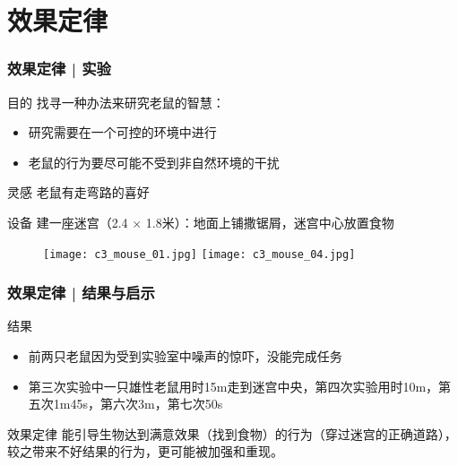 \section{效果定律}
\begin{frame}
  \frametitle{效果定律 | 实验}
    \vspace{-0.5em}
  \begin{block}{目的}
    找寻一种办法来研究老鼠的智慧：
    \begin{itemize}
      \item 研究需要在一个可控的环境中进行
      \item 老鼠的行为要尽可能不受到非自然环境的干扰
    \end{itemize}
  \end{block}
    \vspace{-0.5em}
  \pause
  \begin{block}{灵感}
    老鼠有走弯路的喜好
  \end{block}
    \vspace{-0.5em}
  \pause
  \begin{block}{设备}
    建一座迷宫（2.4 $\times$ 1.8米）：地面上铺撒锯屑，迷宫中心放置食物
    \vspace{-0.8em}
    \begin{figure}
      \centering
      \texttt{[image: c3\_mouse\_01.jpg]}\quad
      \texttt{[image: c3\_mouse\_04.jpg]}
    \end{figure}
  \end{block}
\end{frame}

\begin{frame}
  \frametitle{效果定律 | 结果与启示}
  \begin{block}{结果}
    \begin{itemize}
      \item 前两只老鼠因为受到实验室中噪声的惊吓，没能完成任务
      \item 第三次实验中一只雄性老鼠用时15m走到迷宫中央，第四次实验用时10m，第五次1m45s，第六次3m，第七次50s
    \end{itemize}
  \end{block}
  \pause
  \begin{block}{效果定律}
    能引导生物达到满意效果（找到食物）的行为（穿过迷宫的正确道路），较之带来不好结果的行为，更可能被加强和重现。
  \end{block}
\end{frame}

